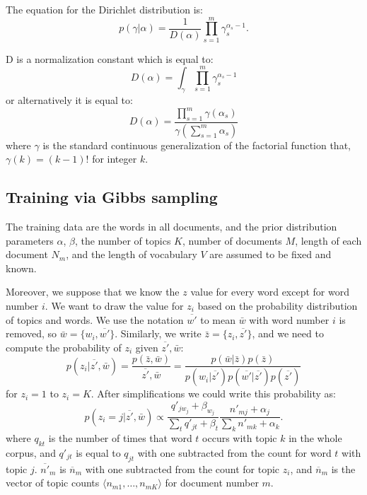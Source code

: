 \documentclass[twoside,12pt]{article}
\begin{document}
The equation for the Dirichlet distribution is:
\begin{equation}
p(\gamma|\alpha)=\frac{1}{D(\alpha)}\prod_{s=1}^{m}\gamma_s^{\alpha_s-1}.
\end{equation}


D is a normalization constant which is equal to:
\begin{equation}
D(\alpha)=\int_{\gamma}\prod_{s=1}^m \gamma_s^{\alpha_s-1}
\end{equation}
or alternatively it is equal to:
\begin{equation}
D(\alpha)=\frac{\prod_{s=1}^m \gamma(\alpha_s)}{\gamma(\sum_{s=1}^{m}\alpha_s)}
\end{equation}
where $\gamma$ is the standard continuous generalization of the factorial function that, $\gamma(k)=(k-1)!$ for integer $k$.
\subsection{Training via Gibbs sampling}
The training data are the words in all documents, and the prior distribution parameters $\alpha$, $\beta$, the number of topics $K$, number of documents $M$, length of each document $N_m$, and the length of vocabulary $V$ are assumed to be fixed and known.

Moreover, we suppose that we know the $z$ value for every word except for word number $i$. We want to draw the value for $z_i$ based on the probability distribution of topics and words. We use the notation $\overline{w'}$ to mean $\bar{w}$ with word number $i$ is removed, so $\bar{w}=\{w_i,\overline{w'}\}$. Similarly, we write $\bar{z}=\{z_i,\overline{z'}\}$, and we need to compute the probability of $z_i$ given $\overline{z'},\bar{w}$:
\begin{equation}
p(z_i|\overline{z'},\bar{w})=\frac{p(\bar{z},\bar{w})}{\overline{z'},\bar{w}}=\frac{p(\bar{w}|\bar{z})p(\bar{z})}{p(w_i|\overline{z'})p(\overline{w'}|\overline{z'})p(\overline{z'})}
\end{equation}
for $z_i=1$ to $z_i=K$. After simplifications we could write this probability as:
\begin{equation}
p(z_i=j|\overline{z'},\bar{w})\propto \frac{q'_{jw_j}+\beta_{w_j}}{\sum_t q'_{jt}+\beta_t}\frac{n'_{mj}+\alpha_j}{\sum_k n'_{mk}+\alpha_k}.
\end{equation}
where $q_{kt}$ is the number of times that word $t$ occurs with topic $k$ in the whole corpus, and $q'_{jt}$ is equal to $q_{jt}$ with one subtracted from the count for word $t$ with topic $j$. $\overline{n'}_{m}$ is $\overline{n}_m$ with one subtracted from the count for topic $z_i$, and $\overline{n}_m$ is the vector of topic counts $\langle n_{m1},\ldots,n_{mK} \rangle$ for document number $m$.
\end{document}
